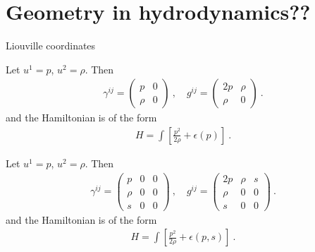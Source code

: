 \chapter{Geometry in hydrodynamics??}

Liouville coordinates

\begin{example}
    Let $u^1 = p$, $u^2 = \rho$. Then 
    \begin{align}
        \gamma^{ij} = \begin{pmatrix}
            p & 0 \\ \rho & 0
        \end{pmatrix}
        \:,
        \quad
        g^{ij} = \begin{pmatrix}
            2p & \rho \\
            \rho & 0
        \end{pmatrix}
        \:.
    \end{align}
    and the Hamiltonian is of the form
    \begin{align}
        H = \int \left[ \frac{p^2}{2 \rho} + \epsilon(p) \right] \:.
    \end{align}
\end{example}

\begin{example}
    Let $u^1 = p$, $u^2 = \rho$. Then 
    \begin{align}
        \gamma^{ij} = \begin{pmatrix}
            p & 0 & 0 \\ \rho & 0 & 0 \\ s & 0 & 0
        \end{pmatrix}
        \:,
        \quad
        g^{ij} = \begin{pmatrix}
            2p & \rho & s \\
            \rho & 0 & 0 \\
            s & 0 & 0
        \end{pmatrix}
        \:.
    \end{align}
    and the Hamiltonian is of the form
    \begin{align}
        H = \int \left[ \frac{p^2}{2 \rho} + \epsilon(p,s) \right] \:.
    \end{align}
\end{example}

